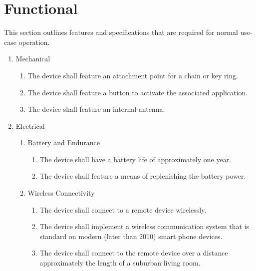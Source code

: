\documentclass[twoside]{article}
\begin{document}
\section{Functional}
This section outlines features and specifications that are required for normal use-case operation.
\begin{enumerate}

\item Mechanical
  \begin{enumerate}

  \item The device shall feature an attachment point for a chain or key ring.

  \item The device shall feature a button to activate the associated application.

  \item The device shall feature an internal antenna.

  \end{enumerate}

\item Electrical
  \begin{enumerate}

  \item Battery and Endurance
    \begin{enumerate}

    \item The device shall have a battery life of approximately one year.

    \item The device shall feature a means of replenishing the battery power.

    \end{enumerate}

  \item Wireless Connectivity

    \begin{enumerate}

    \item The device shall connect to a remote device wirelessly.

    \item The device shall implement a wireless communication system that is standard on modern (later than 2010) smart phone devices.

    \item The device shall connect to the remote device over a distance approximately the length of a suburban living room.


\end{enumerate}
\end{enumerate}
\end{enumerate}
\end{document}
